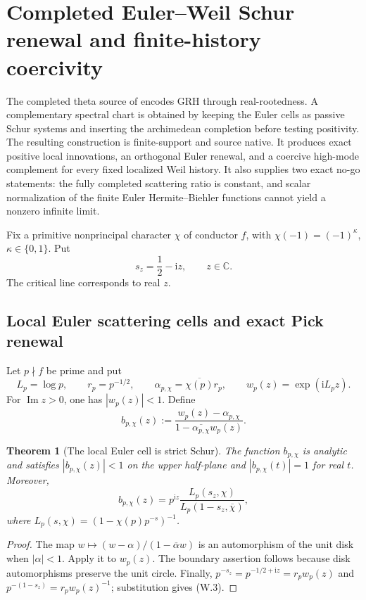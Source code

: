 \documentclass[11pt]{article}
\newtheorem{theorem}{Theorem}[section]
\theoremstyle{definition}
\theoremstyle{remark}
\newcommand{\C}{\mathbb C}
\newcommand{\im}{\operatorname{Im}}
\begin{document}
\section{Completed Euler--Weil Schur renewal and finite-history coercivity}
\label{sec:grh-weil-schur}

The completed theta source of  encodes GRH through
real-rootedness.  A complementary spectral chart is obtained by keeping the
Euler cells as passive Schur systems and inserting the archimedean completion
before testing positivity.  The resulting construction is finite-support and
source native.  It produces exact positive local innovations, an orthogonal
Euler renewal, and a coercive high-mode complement for every fixed localized
Weil history.  It also supplies two exact no-go statements: the fully
completed scattering ratio is constant, and scalar normalization of the
finite Euler Hermite--Biehler functions cannot yield a nonzero infinite
limit.

Fix a primitive nonprincipal character $\chi$ of conductor $f$, with
$\chi(-1)=(-1)^{\kappa}$, $\kappa\in\{0,1\}$.  Put
\[
 s_z=\frac12-\mathrm i z,
 \qquad z\in\C.
 \tag{W.1}
\]
The critical line corresponds to real $z$.

\subsection{Local Euler scattering cells and exact Pick renewal}

Let $p\nmid f$ be prime and put
\[
 L_p=\log p,
 \qquad r_p=p^{-1/2},
 \qquad \alpha_{p,\chi}=\overline{\chi(p)}r_p,
 \qquad w_p(z)=\exp(\mathrm iL_pz).
\]
For $\im z>0$, one has $|w_p(z)|<1$.  Define
\[
 \boxed{
 b_{p,\chi}(z)
 :=\frac{w_p(z)-\alpha_{p,\chi}}
         {1-\overline{\alpha_{p,\chi}}w_p(z)}.}
 \tag{W.2}
\]

\begin{theorem}[The local Euler cell is strict Schur]
\label{thm:weil-local-Schur}
The function $b_{p,\chi}$ is analytic and satisfies
$|b_{p,\chi}(z)|<1$ on the upper half-plane and
$|b_{p,\chi}(t)|=1$ for real $t$.  Moreover,
\[
 \boxed{
 b_{p,\chi}(z)
 =p^{\mathrm iz}
  \frac{L_p(s_z,\chi)}{L_p(1-s_z,\overline\chi)},}
 \tag{W.3}
\]
where $L_p(s,\chi)=(1-\chi(p)p^{-s})^{-1}$.
\end{theorem}

\begin{proof}
The map $w\mapsto(w-\alpha)/(1-\overline\alpha w)$ is an automorphism of the
unit disk when $|\alpha|<1$.  Apply it to $w_p(z)$.  The boundary assertion
follows because disk automorphisms preserve the unit circle.  Finally,
$p^{-s_z}=p^{-1/2+\mathrm iz}=r_pw_p(z)$ and
$p^{-(1-s_z)}=r_pw_p(z)^{-1}$; substitution gives \textup{(W.3)}.
\end{proof}
\end{document}
